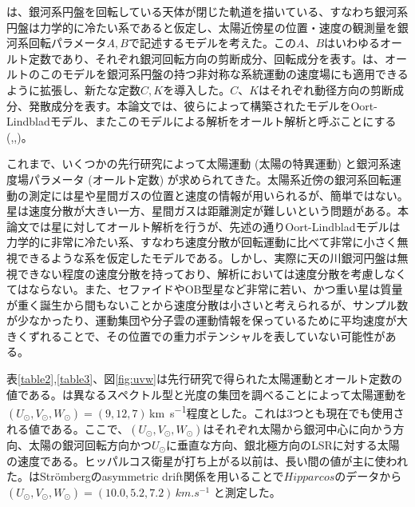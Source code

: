 \cite{Oort1927a}は、銀河系円盤を回転している天体が閉じた軌道を描いている、すなわち銀河系円盤は力学的に冷たい系であると仮定し、太陽近傍星の位置・速度の観測量を銀河系回転パラメータ$A,B$で記述するモデルを考えた。この$A、B$はいわゆるオールト定数であり、それぞれ銀河回転方向の剪断成分、回転成分を表す。\cite{Chandra42}は、オールトのこのモデルを銀河系円盤の持つ非対称な系統運動の速度場にも適用できるように拡張し、新たな定数$C,K$を導入した。$C、K$はそれぞれ動径方向の剪断成分、発散成分を表す。本論文では、彼らによって構築されたモデルをOort-Lindbladモデル、またこのモデルによる解析をオールト解析と呼ぶことにする (\cite{Oort1927a},\cite{Lindblad1927},\cite{Chandra42})。



これまで、いくつかの先行研究によって太陽運動 (太陽の特異運動) と銀河系速度場パラメータ (オールト定数) が求められてきた。太陽系近傍の銀河系回転運動の測定には星や星間ガスの位置と速度の情報が用いられるが、簡単ではない。星は速度分散が大きい一方、星間ガスは距離測定が難しいという問題がある。本論文では星に対してオールト解析を行うが、先述の通りOort-Lindbladモデルは力学的に非常に冷たい系、すなわち速度分散が回転運動に比べて非常に小さく無視できるような系を仮定したモデルである。しかし、実際に天の川銀河円盤は無視できない程度の速度分散を持っており、解析においては速度分散を考慮しなくてはならない。また、セファイドやOB型星など非常に若い、かつ重い星は質量が重く誕生から間もないことから速度分散は小さいと考えられるが、サンプル数が少なかったり、運動集団や分子雲の運動情報を保っているために平均速度が大きくずれることで、その位置での重力ポテンシャルを表していない可能性がある。

表\ref{table2},\ref{table3}、図\ref{fig:uvw}は先行研究で得られた太陽運動とオールト定数の値である。\cite{Delhaye1965}は異なるスペクトル型と光度の集団を調べることによって太陽運動を$(U_{\odot},V_{\odot},W_{\odot})=(9,12,7)$\,\si{km.s^{-1}}程度とした。これは3つとも現在でも使用される値である。ここで、$(U_{\odot},V_{\odot},W_{\odot})$はそれぞれ太陽から銀河中心に向かう方向、太陽の銀河回転方向かつ$U_{\odot}$に垂直な方向、銀北極方向のLSRに対する太陽の速度である。ヒッパルコス衛星が打ち上がる以前は、長い間\cite{Delhaye1965}の値が主に使われた。\cite{DB1998}はStr\"{o}mbergのasymmetric drift関係を用いることで$Hipparcos$のデータから$(U_{\odot},V_{\odot},W_{\odot}) = (10.0, 5.2, 7.2)\,\si{km.s^{-1}}$ と測定した。

